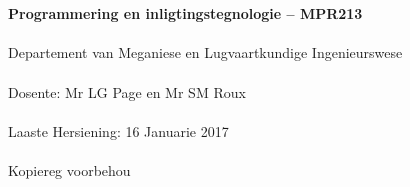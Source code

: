 \begin{titlepage}
    \thispagestyle{empty}
    \\~\\[18cm]
    \large
    \textbf{Programmering en inligtingstegnologie -- MPR213} \\~\\
    Departement van Meganiese en Lugvaartkundige Ingenieurswese \\~\\[0.5cm]
    \normalsize
    Dosente: Mr LG Page en  Mr SM Roux \\~\\
    Laaste Hersiening: 16 Januarie 2017 \\~\\[0.5em]
    \textcopyright \quad Kopiereg voorbehou \\~\\
\end{titlepage}
\restoregeometry
